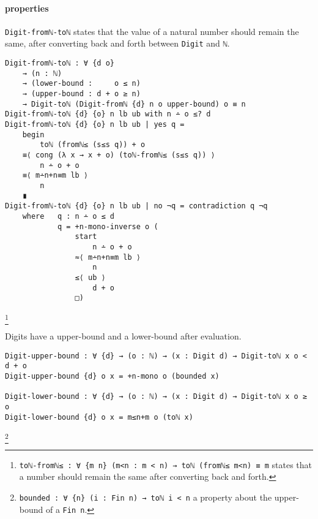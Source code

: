 \documentclass[\main/thesis.tex]{subfiles}
\begin{document}
\paragraph{properties}

\begin{center}
\end{center}

{\lstinline|Digit-fromℕ-toℕ|} states that the value of a natural number should
remain the same, after converting back and forth between {\lstinline|Digit|} and
{\lstinline|ℕ|}.

\begin{lstlisting}
Digit-fromℕ-toℕ : ∀ {d o}
    → (n : ℕ)
    → (lower-bound :     o ≤ n)
    → (upper-bound : d + o ≥ n)
    → Digit-toℕ (Digit-fromℕ {d} n o upper-bound) o ≡ n
Digit-fromℕ-toℕ {d} {o} n lb ub with n ∸ o ≤? d
Digit-fromℕ-toℕ {d} {o} n lb ub | yes q =
    begin
        toℕ (fromℕ≤ (s≤s q)) + o
    ≡⟨ cong (λ x → x + o) (toℕ-fromℕ≤ (s≤s q)) ⟩
        n ∸ o + o
    ≡⟨ m∸n+n≡m lb ⟩
        n
    ∎
Digit-fromℕ-toℕ {d} {o} n lb ub | no ¬q = contradiction q ¬q
    where   q : n ∸ o ≤ d
            q = +n-mono-inverse o (
                start
                    n ∸ o + o
                ≈⟨ m∸n+n≡m lb ⟩
                    n
                ≤⟨ ub ⟩
                    d + o
                □)
\end{lstlisting}
\footnote{
    {\lstinline|toℕ-fromℕ≤ : ∀ {m n} (m<n : m < n) → toℕ (fromℕ≤ m<n) ≡ m|}
    \newline\hspace*{4em} states that a number should remain the same after converting back and forth.
}

Digits have a upper-bound and a lower-bound after evaluation.

\begin{lstlisting}[basicstyle=\ttfamily\scriptsize]
Digit-upper-bound : ∀ {d} → (o : ℕ) → (x : Digit d) → Digit-toℕ x o < d + o
Digit-upper-bound {d} o x = +n-mono o (bounded x)

Digit-lower-bound : ∀ {d} → (o : ℕ) → (x : Digit d) → Digit-toℕ x o ≥ o
Digit-lower-bound {d} o x = m≤n+m o (toℕ x)
\end{lstlisting}
\footnote{
    {\lstinline|bounded : ∀ {n} (i : Fin n) → toℕ i < n|}
    \newline\hspace*{4em} a property about the upper-bound of a {\lstinline|Fin n|}.
}
\end{document}
